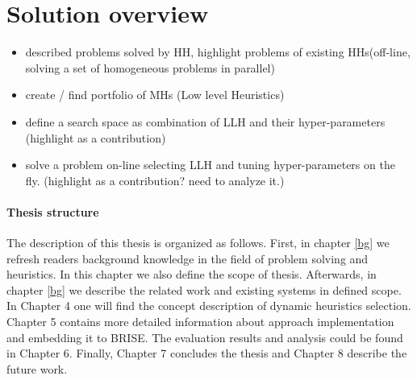 \section{Solution overview}

\begin{itemize}
	\item described problems solved by HH, highlight problems of existing HHs(off-line, solving a set of homogeneous problems in parallel)
	\item create / find portfolio of MHs (Low level Heuristics)
	\item define a search space as combination of LLH and their hyper-parameters (highlight as a contribution)
	\item solve a problem on-line selecting LLH and tuning hyper-parameters on the fly. (highlight as a contribution? need to analyze it.)
\end{itemize}

\paragraph{Thesis structure}
The description of this thesis is organized as follows. First, in chapter \ref{bg} we refresh readers background knowledge in the field of problem solving and heuristics. In this chapter we also define the scope of thesis. Afterwards, in chapter \ref{bg} we describe the related work and existing systems in defined scope. In Chapter 4 one will find the concept description of dynamic heuristics selection. Chapter 5 contains more detailed information about approach implementation and  embedding it to BRISE. The evaluation results and analysis could be found in Chapter 6. Finally, Chapter 7 concludes the thesis and Chapter 8 describe the future work.

